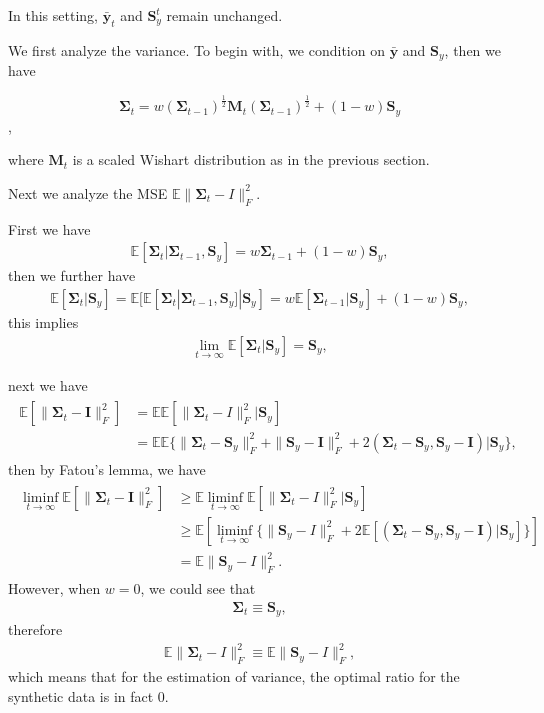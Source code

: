 \begin{remark}
In this setting, $\bar{\bm{y}}_t$ and $\bm{S}_y^t$ remain unchanged.
\end{remark}

We first analyze the variance. To begin with, we condition on $\bar{\bm
y} $ and $\bm{S}_y$, then we have

\[
\bm{\Sigma}_t = w  (\bm{\Sigma}_{t-1})^{\frac{1}{2}} \bm{M}_t (\bm{\Sigma}_{t-1})^{\frac{1}{2}} + (1 - w) \bm{S}_y
\],

where $\bm{M}_t$ is  a scaled Wishart distribution as in the previous section.

Next we analyze the MSE $
\mathbb{E}\| \bm{\Sigma}_t-I\|_F^2 $. 

First we have
\begin{align}
\mathbb{E}[\bm{\Sigma}_t | \bm{\Sigma}_{t-1}, \bm{S}_y
]= w \bm{\Sigma}_{t-1}+(1-w)\bm{S}_y,
\end{align}
then we further have
\begin{align}
\mathbb{E}[\bm{\Sigma}_t| \bm{S}_y]=\mathbb{E}[\mathbb{E}[\bm{\Sigma}_t|\bm{\Sigma}_{t-1},\bm{S}_y] | \bm{S}_y]=w\mathbb{E}[\bm{\Sigma}_{t-1}|\bm{S}_y]+(1-w)\bm{S}_y,
\end{align}
this implies
\begin{align}
\lim_{t \to \infty}\mathbb{E}[\bm{\Sigma}_t | \bm{S}_y]=\bm{S}_y,
\end{align}

next we have
\begin{align}
\begin{split}
\mathbb{E}[ \|
\bm{\Sigma}_t-\bm{I}
\|_F^2 ]&=\mathbb{E}\mathbb{E} [\|\bm{\Sigma}_t-I
\|_F^2  | \bm{S}_y] \\
&=\mathbb{E}\mathbb{E}\{\|\bm{\Sigma}_t-\bm{S}_y  \|_F^2 +\|\bm{S}_y-\bm{I} \|_F^2+ 2(
\bm{\Sigma}_t-\bm{S}_y, \bm{S}_y-\bm{I}
) |\bm{S}_y \} ,
\end{split}
\end{align}
then by Fatou's lemma, we have
\begin{align}
\begin{split}
\liminf_{t \to \infty}{\mathbb{E}[ \|
\bm{\Sigma}_t-\bm{I}
\|_F^2 ]}&\geq \mathbb{E}\liminf_{t \to \infty}{ \mathbb{E} [\|\bm{\Sigma}_t-I
\|_F^2  | \bm{S}_y]
} \\
& \geq \mathbb{E} [\liminf_{t \to \infty}\{  \|\bm{S}_y-I \|_F^2+ 2\mathbb{E}[(
\bm{\Sigma}_t-\bm{S}_y, \bm{S}_y-\bm{I}
) |\bm{S}_y]\}] \\
&=\mathbb{E}\|\bm{S}_y-I \|_F^2.
\end{split}
\end{align}
However, when $w=0$, we could see that
\begin{align}
\bm{\Sigma}_t \equiv \bm{S}_y,
\end{align}
therefore 
\begin{align}
\mathbb{E}\|\bm{\Sigma}_t-I \|_F^2 \equiv \mathbb{E}\|\bm{S}_y-I \|_F^2,
\end{align}
which means that for the estimation of variance, the optimal ratio for the synthetic data is in fact 0.

